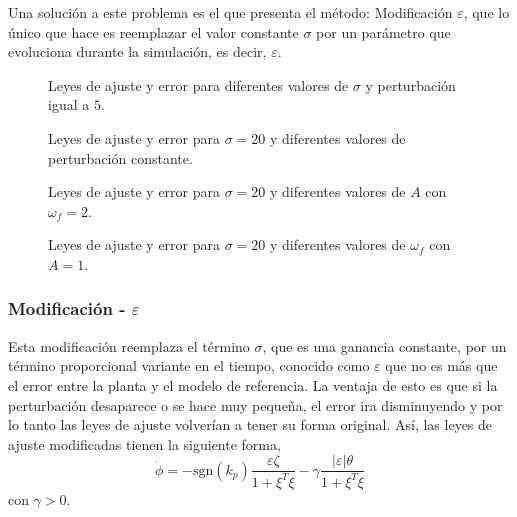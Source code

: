 \documentclass[letterpaper,11pt]{article} %
\begin{document}
Una solución a este problema es el que presenta el método: Modificación $\varepsilon$, que lo único que hace es reemplazar el valor constante $\sigma$ por un parámetro que evoluciona durante la simulación, es decir, $\varepsilon$.

\newpage
\begin{figure}[h]
	\centering
	\captionsetup{justification=centering}
	\caption{Leyes de ajuste y error para diferentes valores de $\sigma$ y perturbación igual a $5$.}
	\label{sigma1}
\end{figure}
\newpage
\begin{figure}[h]
	\centering
	\captionsetup{justification=centering}
	\caption{Leyes de ajuste y error para $\sigma = 20$ y diferentes valores de perturbación constante.}
	\label{sigma2}
\end{figure}
\newpage
\begin{figure}[h]
	\centering
	\captionsetup{justification=centering}
	\caption{Leyes de ajuste y error para $\sigma = 20$ y diferentes valores de $A$ con $\omega_f=2$.}
	\label{sigma3}
\end{figure}
\newpage
\begin{figure}[h]
	\centering
	\captionsetup{justification=centering}
	\caption{Leyes de ajuste y error para $\sigma = 20$ y diferentes valores de $\omega_f$ con $A=1$.}
	\label{sigma4}
\end{figure}

\subsubsection{Modificación - $\varepsilon$}
Esta modificación reemplaza el término $\sigma$, que es una ganancia constante, por un término proporcional variante en el tiempo, conocido como $\varepsilon$ que no es más que el error entre la planta y el modelo de referencia. La ventaja de esto es que si la perturbación desaparece o se hace muy pequeña, el error ira disminuyendo y por lo tanto las leyes de ajuste volverían a tener su forma original. Así, las leyes de ajuste modificadas tienen la siguiente forma,
\begin{equation}
	\dot{\phi} =-\mathrm{sgn}(k_p) \frac{\varepsilon \zeta}{1 + \xi^T \xi} - \gamma \frac{|\varepsilon| \theta}{1 + \xi^T \xi}
\end{equation}
con $\gamma>0$.
\end{document}
